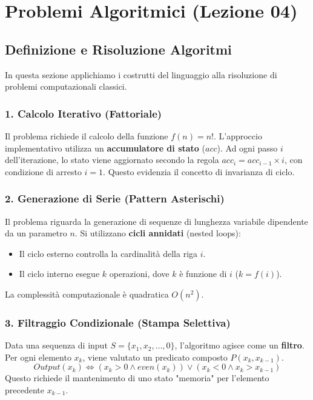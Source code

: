 \section{Problemi Algoritmici (Lezione 04)}

\subsection{Definizione e Risoluzione Algoritmi}
In questa sezione applichiamo i costrutti del linguaggio alla risoluzione di problemi computazionali classici.

\subsubsection{1. Calcolo Iterativo (Fattoriale)}
Il problema richiede il calcolo della funzione $f(n) = n!$.
L'approccio implementativo utilizza un \textbf{accumulatore di stato} ($acc$). Ad ogni passo $i$ dell'iterazione, lo stato viene aggiornato secondo la regola $acc_{i} = acc_{i-1} \times i$, con condizione di arresto $i=1$.
Questo evidenzia il concetto di invarianza di ciclo.

\subsubsection{2. Generazione di Serie (Pattern Asterischi)}
Il problema riguarda la generazione di sequenze di lunghezza variabile dipendente da un parametro $n$.
Si utilizzano \textbf{cicli annidati} (nested loops):
\begin{itemize}
    \item Il ciclo esterno controlla la cardinalità della riga $i$.
    \item Il ciclo interno esegue $k$ operazioni, dove $k$ è funzione di $i$ ($k = f(i)$).
\end{itemize}
La complessità computazionale è quadratica $O(n^2)$.

\subsubsection{3. Filtraggio Condizionale (Stampa Selettiva)}
Data una sequenza di input $S = \{x_1, x_2, \dots, 0\}$, l'algoritmo agisce come un \textbf{filtro}.
Per ogni elemento $x_k$, viene valutato un predicato composto $P(x_k, x_{k-1})$.
$$ Output(x_k) \iff (x_k > 0 \land even(x_k)) \lor (x_k < 0 \land x_k > x_{k-1}) $$
Questo richiede il mantenimento di uno stato "memoria" per l'elemento precedente $x_{k-1}$.

